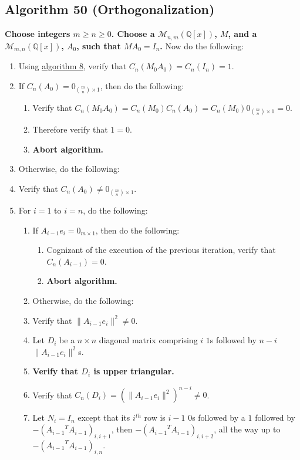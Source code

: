 \documentclass[twocolumn]{article}
\begin{document}
		\subsection{Algorithm 50 (Orthogonalization)}\label{sec:algorithm 50}
			\textbf{Choose integers $m\ge n\ge 0$. Choose a $\mathcal{M}_{n,m}(\mathbb{Q}[x])$, $M$, and a $\mathcal{M}_{m,n}(\mathbb{Q}[x])$, $A_0$, such that $MA_0=I_n$.} Now do the following:
			\begin{enumerate}
				\item Using \hyperref[sec:algorithm 8]{algorithm 8}, verify that $C_n(M_0A_0)=C_n(I_n)=1$.
				\item If $C_n(A_0)=0_{\binom{m}{n}\times 1}$, then do the following:
				\begin{enumerate}
					\item Verify that $C_n(M_0A_0)=C_n(M_0)C_n(A_0)=C_n(M_0)0_{\binom{m}{n}\times 1}=0$.
					\item Therefore verify that $1=0$.
					\item \textbf{Abort algorithm.}
				\end{enumerate}
				\item Otherwise, do the following:
				\item Verify that $C_n(A_0)\ne0_{\binom{m}{n}\times 1}$.
				\item For $i=1$ to $i=n$, do the following:
				\begin{enumerate}
					\item If $A_{i-1}e_i=0_{m\times 1}$, then do the following:
					\begin{enumerate}
						\item Cognizant of the execution of the previous iteration, verify that $C_n(A_{i-1})=0$.
						\item \textbf{Abort algorithm.}
					\end{enumerate}
					\item Otherwise, do the following:
					\item Verify that $\lVert A_{i-1}e_i\rVert^2\ne 0$.
					\item Let $D_i$ be a $n\times n$ diagonal matrix comprising $i$ $1$s followed by $n-i$ $\lVert A_{i-1}e_i\rVert^2$s.
					\item \textbf{Verify that $D_i$ is upper triangular.}
					\item Verify that $C_n(D_i)=(\lVert A_{i-1}e_i\rVert^2)^{n-i}\ne 0$.
					\item Let $N_i=I_n$ except that its $i^{th}$ row is $i-1$ $0$s followed by a $1$ followed by $-({A_{i-1}}^TA_{i-1})_{i,i+1}$, then $-({A_{i-1}}^TA_{i-1})_{i,i+2}$, all the way up to $-({A_{i-1}}^TA_{i-1})_{i,n}$.

\end{enumerate}
\end{enumerate}
\end{document}
